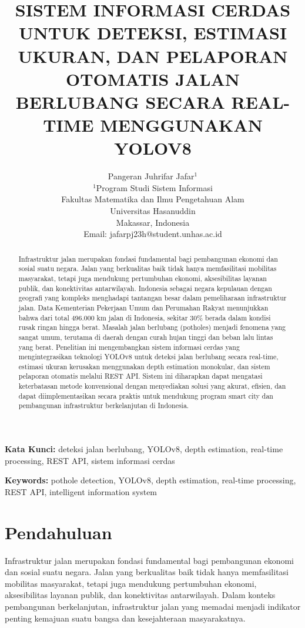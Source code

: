 \documentclass[12pt,a4paper]{article}
\title{\textbf{SISTEM INFORMASI CERDAS UNTUK DETEKSI, ESTIMASI UKURAN, DAN PELAPORAN OTOMATIS JALAN BERLUBANG SECARA REAL-TIME MENGGUNAKAN YOLOV8}}
\author{
    Pangeran Juhrifar Jafar$^1$\\
    $^1$Program Studi Sistem Informasi\\
    Fakultas Matematika dan Ilmu Pengetahuan Alam\\
    Universitas Hasanuddin\\
    Makassar, Indonesia\\
    Email: jafarpj23h@student.unhas.ac.id
}
\date{}
\begin{document}
\maketitle

\begin{abstract}
Infrastruktur jalan merupakan fondasi fundamental bagi pembangunan ekonomi dan sosial suatu negara. Jalan yang berkualitas baik tidak hanya memfasilitasi mobilitas masyarakat, tetapi juga mendukung pertumbuhan ekonomi, aksesibilitas layanan publik, dan konektivitas antarwilayah. Indonesia sebagai negara kepulauan dengan geografi yang kompleks menghadapi tantangan besar dalam pemeliharaan infrastruktur jalan. Data Kementerian Pekerjaan Umum dan Perumahan Rakyat menunjukkan bahwa dari total 496.000 km jalan di Indonesia, sekitar 30\% berada dalam kondisi rusak ringan hingga berat. Masalah jalan berlubang (potholes) menjadi fenomena yang sangat umum, terutama di daerah dengan curah hujan tinggi dan beban lalu lintas yang berat. Penelitian ini mengembangkan sistem informasi cerdas yang mengintegrasikan teknologi YOLOv8 untuk deteksi jalan berlubang secara real-time, estimasi ukuran kerusakan menggunakan depth estimation monokular, dan sistem pelaporan otomatis melalui REST API. Sistem ini diharapkan dapat mengatasi keterbatasan metode konvensional dengan menyediakan solusi yang akurat, efisien, dan dapat diimplementasikan secara praktis untuk mendukung program smart city dan pembangunan infrastruktur berkelanjutan di Indonesia.
\end{abstract}

\textbf{Kata Kunci:} deteksi jalan berlubang, YOLOv8, depth estimation, real-time processing, REST API, sistem informasi cerdas

\textbf{Keywords:} pothole detection, YOLOv8, depth estimation, real-time processing, REST API, intelligent information system

\section{Pendahuluan}

Infrastruktur jalan merupakan fondasi fundamental bagi pembangunan ekonomi dan sosial suatu negara. Jalan yang berkualitas baik tidak hanya memfasilitasi mobilitas masyarakat, tetapi juga mendukung pertumbuhan ekonomi, aksesibilitas layanan publik, dan konektivitas antarwilayah. Dalam konteks pembangunan berkelanjutan, infrastruktur jalan yang memadai menjadi indikator penting kemajuan suatu bangsa dan kesejahteraan masyarakatnya.
\end{document}
